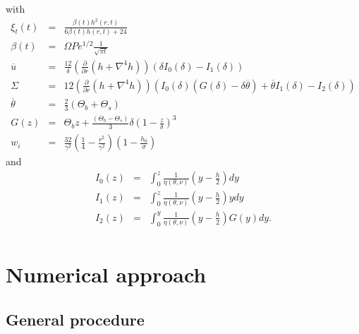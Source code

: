   with
  \begin{eqnarray}
    \xi_t(t)&=&\frac{\beta(t) h^{2}{\left (r,t \right )}}{6 \beta(t) h{\left (r,t \right )}
                + 24}\\
    \beta(t) &=& \Omega Pe^{1/2}\frac{1}{\sqrt{\pi t}}\\
    \overline{u}&=& \frac{12}{\delta}
                    \left( \frac{\partial }{\partial r}\left(h+\nabla^4h\right)\right)\left(\delta
                    I_0(\delta)-I_1(\delta)\right)\\
                    \Sigma     &=&12   \left( \frac{\partial }{\partial r}\left(h+\nabla^4h\right)\right)\left(I_0(\delta)\left(G(\delta)-\delta\overline{\theta}\right)+\overline{\theta}I_1(\delta)-I_2(\delta)\right)\\
    \overline{\theta}                                              &=&
                          \frac{2}{3}\left( \Theta_{b}+\Theta_{s}\right)\\
    G(z)              &    = &                \Theta_b                  z
    +\frac{\left(\Theta_b-\Theta_s\right)}{3}\delta\left(1-\frac{z}{\delta}\right)^3\\
w_i&=&\frac{32}{\gamma^{2}}\left(\frac{1}{4}-\frac{r^{2}}{\gamma^{2}}\right)\left(1-\frac{h_0}{\sigma}\right)
  \end{eqnarray}
and
\begin{eqnarray}
  I_0(z)&=&\int_0^z\frac{1}{\eta(\theta,\nu)}\left(y-\frac{h}{2}\right)
    dy \\
I_1(z) &=& \int_0^z\frac{1}{\eta(\theta,\nu)}\left(y-\frac{h}{2}\right)y dy\\
    I_2(z)&=&\int_0^y                         \frac{1}{\eta(\theta,\nu)}
    \left(y-\frac{h}{2}\right)G(y)dy.\\
\end{eqnarray}


\section{Numerical approach}
\label{C3-sec:numerical-approach}

\subsection{General procedure}
\label{sec:general-procedure}

